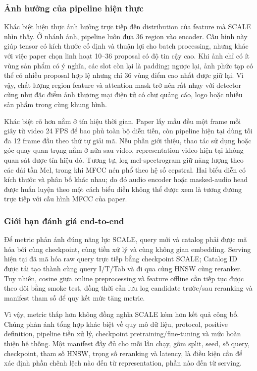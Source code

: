 \documentclass[10pt,conference]{IEEEtran}
\begin{document}
\subsubsection{Ảnh hưởng của pipeline hiện thực}

Khác biệt hiện thực ảnh hưởng trực tiếp đến distribution của feature mà SCALE nhìn thấy. Ở nhánh ảnh, pipeline luôn đưa 36 region vào encoder. Cấu hình này giúp tensor có kích thước cố định và thuận lợi cho batch processing, nhưng khác với việc paper chọn linh hoạt 10--36 proposal có độ tin cậy cao. Khi ảnh chỉ có ít vùng sản phẩm có ý nghĩa, các slot còn lại là padding; ngược lại, ảnh phức tạp có thể có nhiều proposal hợp lệ nhưng chỉ 36 vùng điểm cao nhất được giữ lại. Vì vậy, chất lượng region feature và attention mask trở nên rất nhạy với detector cũng như đặc điểm ảnh thương mại điện tử có chữ quảng cáo, logo hoặc nhiều sản phẩm trong cùng khung hình.

Khác biệt rõ hơn nằm ở tín hiệu thời gian. Paper lấy mẫu đều một frame mỗi giây từ video 24 FPS để bao phủ toàn bộ diễn tiến, còn pipeline hiện tại dùng tối đa 12 frame đầu theo thứ tự giải mã. Nếu phần giới thiệu, thao tác sử dụng hoặc góc quay quan trọng nằm ở nửa sau video, representation video hiện tại không quan sát được tín hiệu đó. Tương tự, log mel-spectrogram giữ năng lượng theo các dải tần Mel, trong khi MFCC nén phổ theo hệ số cepstral. Hai biểu diễn có kích thước và phân bố khác nhau; do đó audio encoder hoặc masked-audio head được huấn luyện theo một cách biểu diễn không thể được xem là tương đương trực tiếp với cấu hình MFCC của paper.

\subsubsection{Giới hạn đánh giá end-to-end}

Để metric phản ánh đúng năng lực SCALE, query mới và catalog phải được mã hóa bởi cùng checkpoint, cùng tiền xử lý và cùng không gian embedding. Serving hiện tại đã mã hóa raw query trực tiếp bằng checkpoint SCALE; Catalog ID được tái tạo thành cùng query I/T/Tab và đi qua cùng HNSW cùng reranker. Tuy nhiên, cosine giữa online preprocessing và feature offline cần tiếp tục được theo dõi bằng smoke test, đồng thời cần lưu log candidate trước/sau reranking và manifest tham số để quy kết mức tăng metric.

Vì vậy, metric thấp hơn không đồng nghĩa SCALE kém hơn kết quả công bố. Chúng phản ánh tổng hợp khác biệt về quy mô dữ liệu, protocol, positive definition, pipeline tiền xử lý, checkpoint pretraining/fine-tuning và mức hoàn thiện hệ thống. Một manifest đầy đủ cho mỗi lần chạy, gồm split, seed, số query, checkpoint, tham số HNSW, trọng số reranking và latency, là điều kiện cần để xác định phần chênh lệch nào đến từ representation, phần nào đến từ serving.
\end{document}
